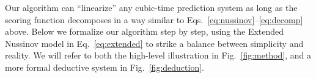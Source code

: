Our \linearfold algorithm can ``linearize'' any cubic-time prediction system
as long as the scoring function decomposes in a way similar to Eqs.~\ref{eq:nussinov}--\ref{eq:decomp} above.
Below we formalize our \linearfold algorithm step by step, %
using the Extended Nussinov model in Eq.~\ref{eq:extended} to strike a balance between simplicity
and reality.
We will refer to both the high-level illustration in Fig.~\ref{fig:method},
and a more formal deductive system in Fig.~\ref{fig:deduction}.



